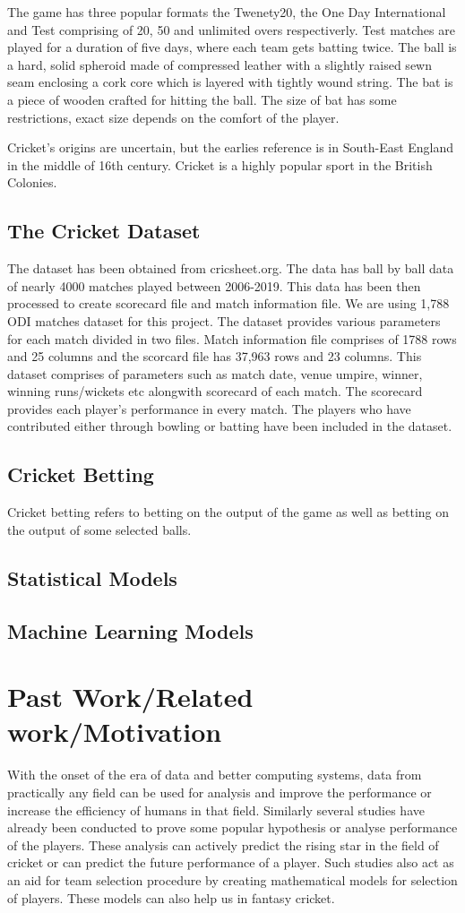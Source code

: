 \documentclass[fleqn,10pt]{wlscirep}
\begin{document}
The game has three popular formats the Twenety20, the One Day International and Test comprising of 20, 50 and unlimited overs respectiverly. Test matches are played for a
duration of five days, where each team gets batting twice.
The ball is a hard, solid spheroid made of compressed leather with a slightly raised sewn seam enclosing a cork core which is layered with tightly wound string. The bat is a
piece of wooden crafted for hitting the ball. The size of bat has some restrictions, exact size depends on the comfort of the player.

Cricket's origins are uncertain, but the earlies reference is in South-East England in the middle of 16th century. Cricket is a highly popular sport 
in the British Colonies.

\subsection{The Cricket Dataset}
The dataset has been obtained from cricsheet.org. The data has ball by ball data of nearly 4000 matches played
between 2006-2019. This data has been then processed to create scorecard file and match information file.
We are using 1,788 ODI matches dataset for this project. The dataset provides various parameters for each match divided in two files.
Match information file comprises of 1788 rows and 25 columns and the scorcard file has 37,963 rows and 23 columns.
This dataset comprises of parameters such as match date, venue umpire, winner, winning runs/wickets etc alongwith scorecard of each match.
The scorecard provides each player's performance in every match. The players who have contributed either through bowling or batting have been included in the dataset.

\subsection{Cricket Betting}
Cricket betting refers to betting on the output of the game as well as betting on the output of some selected balls.
\subsection{Statistical Models}
\subsection{Machine Learning Models}
\section{Past Work/Related work/Motivation}
With the onset of the era of data and better computing systems, data from practically any field can be used for analysis and 
improve the performance or increase the efficiency of humans in that field. Similarly several studies have already been conducted to prove some popular 
hypothesis or analyse performance of the players. These analysis can actively predict the rising star in the field of cricket or can predict the 
future performance of a player. Such studies also act as an aid for team selection procedure by creating mathematical models for selection of players.
These models can also help us in fantasy cricket.
\end{document}
